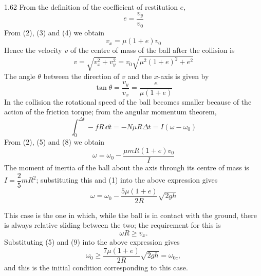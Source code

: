 \begin{solution}{1.62}
From the definition of the coefficient of restitution $e$,
\begin{equation}
e=\frac{v_y}{v_0} \tag{4}
\end{equation}
From (2), (3) and (4) we obtain
\begin{equation}
v_x=\mu(1+e)v_0 \tag{5}
\end{equation}
Hence the velocity $v$ of the centre of mass of the ball after the collision is
\begin{equation}
v=\sqrt{v_x^2+v_y^2}=v_0\sqrt{\mu^2(1+e)^2+e^2} \tag{6}
\end{equation}
The angle $\theta$ between the direction of $v$ and the $x$-axis is given by
\begin{equation}
\tan\theta=\frac{v_y}{v_x}=\frac{e}{\mu(1+e)} \tag{7}
\end{equation}
In the collision the rotational speed of the ball becomes smaller because of the action of the friction torque; from the angular momentum theorem,
\begin{equation}
\int_0^{\Delta t}-fR\,\dd t=-N\mu R\Delta t=I\left(\omega-\omega_0\right) \tag{8}
\end{equation}
From (2), (5) and (8) we obtain
\[
\omega=\omega_0-\frac{\mu mR(1+e)v_0}{I}
\]
The moment of inertia of the ball about the axis through its centre of mass is $I=\dfrac{2}{5}mR^2$; substituting this and (1) into the above expression gives
\begin{equation}
\omega=\omega_0-\frac{5\mu(1+e)}{2R}\sqrt{2gh} \tag{9}
\end{equation}

This case is the one in which, while the ball is in contact with the ground, there is always relative sliding between the two; the requirement for this is
\[
\omega R\geq v_x .
\]
Substituting (5) and (9) into the above expression gives
\[
\omega_0\geq\frac{7\mu(1+e)}{2R}\sqrt{2gh}=\omega_{0c},
\]
and this is the initial condition corresponding to this case.


\end{solution}
